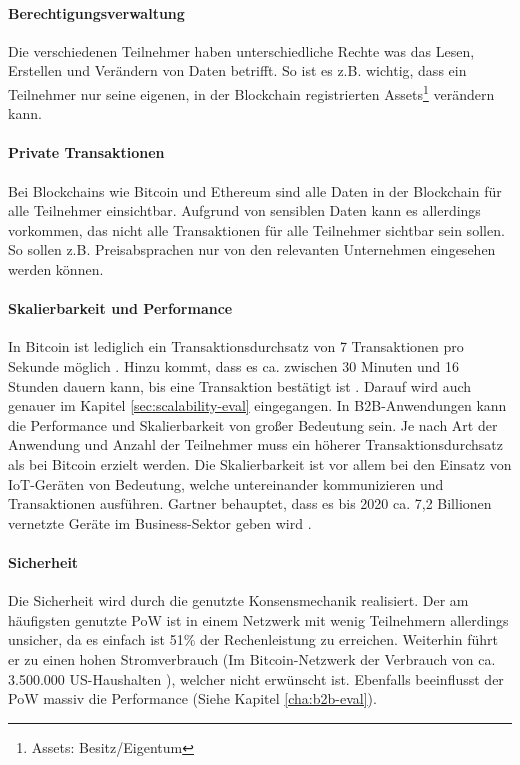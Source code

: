 \paragraph{Berechtigungsverwaltung}
Die verschiedenen Teilnehmer haben unterschiedliche Rechte was das Lesen, Erstellen und Verändern von Daten betrifft. So ist es z.B. wichtig, dass ein Teilnehmer nur seine eigenen, in der Blockchain registrierten Assets\footnote{Assets: Besitz/Eigentum} verändern kann.

\paragraph{Private Transaktionen}
Bei Blockchains wie Bitcoin und Ethereum sind alle Daten in der Blockchain für alle Teilnehmer einsichtbar. Aufgrund von sensiblen Daten kann es allerdings vorkommen, das nicht alle Transaktionen für alle Teilnehmer sichtbar sein sollen. So sollen z.B. Preisabsprachen nur von den relevanten Unternehmen eingesehen werden können.

\paragraph{Skalierbarkeit und Performance}
In Bitcoin ist lediglich ein Transaktionsdurchsatz von 7 Transaktionen pro Sekunde möglich \cite{ZhengBlockchainChallengesOpportunities2017}. Hinzu kommt, dass es ca. zwischen 30 Minuten und 16 Stunden dauern kann, bis eine Transaktion bestätigt ist \cite{BuchkoHowLongBitcoin2017}. Darauf wird auch genauer im Kapitel \ref{sec:scalability-eval} eingegangen. In B2B-Anwendungen kann die Performance und Skalierbarkeit von großer Bedeutung sein. Je nach Art der Anwendung und Anzahl der Teilnehmer muss ein höherer Transaktionsdurchsatz als bei Bitcoin erzielt werden. Die Skalierbarkeit ist vor allem bei den Einsatz von IoT-Geräten von Bedeutung, welche untereinander kommunizieren und Transaktionen ausführen. Gartner behauptet, dass es bis 2020 ca. 7,2 Billionen vernetzte Geräte im Business-Sektor geben wird \cite{RobGartnerSaysBillion2015}.

\paragraph{Sicherheit}
Die Sicherheit wird durch die genutzte Konsensmechanik realisiert. Der am häufigsten genutzte PoW ist in einem Netzwerk mit wenig Teilnehmern allerdings unsicher, da es einfach ist 51\% der Rechenleistung zu erreichen. Weiterhin führt er zu einen hohen Stromverbrauch (Im Bitcoin-Netzwerk der Verbrauch von ca. 3.500.000 US-Haushalten \cite{DigiconomistBitcoinEnergyConsumption}), welcher nicht erwünscht ist. Ebenfalls beeinflusst der PoW massiv die Performance (Siehe Kapitel \ref{cha:b2b-eval}).



